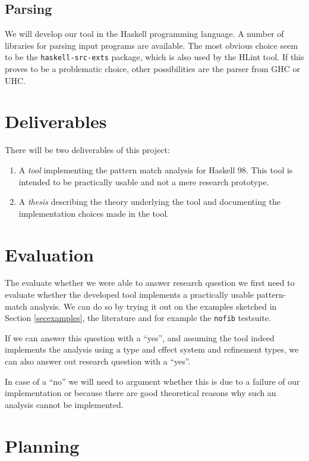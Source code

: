 \documentclass[a4paper]{report}
\begin{document}
\section{Parsing}

We will develop our tool in the Haskell programming language. A number of libraries for parsing input programs are available. The most obvious choice seem to be the {\tt haskell-src-exts} package, which is also used by the HLint tool. If this proves to be a problematic choice, other possibilities are the parser from GHC or UHC.

\chapter{Deliverables}\label{secdeliverables}

There will be two deliverables of this project:
\begin{enumerate}
\item A \emph{tool} implementing the pattern match analysis for Haskell 98. This tool is intended to be practically usable and not a mere research prototype.
\item A \emph{thesis} describing the theory underlying the tool and documenting the implementation choices made in the tool.
\end{enumerate}

\chapter{Evaluation}\label{secevaluation}

The evaluate whether we were able to answer research question we first need to evaluate whether the developed tool implements a practically usable pattern-match analysis. We can do so by trying it out on the examples sketched in Section \ref{secexamples}, the literature and for example the {\tt nofib} testsuite.

If we can answer this question with a ``yes'', and assuming the tool indeed implements the analysis using a type and effect system and refinement types, we can also answer out research question with a ``yes''.

In case of a ``no'' we will need to argument whether this is due to a failure of our implementation or because there are good theoretical reasons why such an analysis cannot be implemented.

\chapter{Planning}\label{secplanning}
\end{document}

